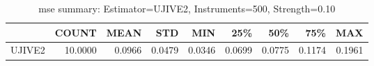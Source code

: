 \begin{table}[ht]
\centering
\caption{mse summary: Estimator=UJIVE2, Instruments=500, Strength=0.10}
\begin{tabular}{lrrrrrrrr}
\toprule
 & COUNT & MEAN & STD & MIN & 25\% & 50\% & 75\% & MAX \\
\midrule
UJIVE2 & 10.0000 & 0.0966 & 0.0479 & 0.0346 & 0.0699 & 0.0775 & 0.1174 & 0.1961 \\
\bottomrule
\end{tabular}
\end{table}
